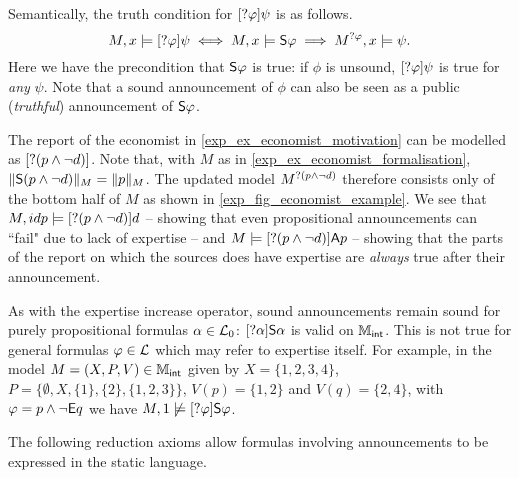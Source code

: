 Semantically, the truth condition for $[\sndann\phi]\psi$ is as follows.
\[
M, x \models [\sndann\phi]\psi
    \iff
M, x \models \S\phi \implies M^{\sndann\phi}, x \models \psi.
\]
Here we have the precondition that $\S\phi$ is true: if $\phi$ is unsound,
$[\sndann\phi]\psi$ is true for \emph{any} $\psi$. Note that a sound
announcement of $\phi$ can also be seen as a public (\emph{truthful})
announcement of $\S\phi$.

\begin{example}
\label{exp_ex_dynamic}

    The report of the economist in \cref{exp_ex_economist_motivation} can be
    modelled as $[\sndann(p \land \neg d)]$. Note that, with $M$ as in
    \cref{exp_ex_economist_formalisation}, $\|\S(p \land \neg d)\|_M = \|p\|_M$.
    The updated model $M^{\sndann(p \land \neg d)}$ therefore consists only of
    the bottom half of $M$ as shown in \cref{exp_fig_economist_example}. We see
    that $M, idp \models [\sndann(p \land \neg d)]d$ -- showing that even
    propositional announcements can ``fail" due to lack of expertise -- and $M
    \models [\sndann(p \land \neg d)]\A p$ -- showing that the parts of the
    report on which the sources does have expertise are \emph{always} true
    after their announcement.

\end{example}

As with the expertise increase operator, sound announcements remain sound for
purely propositional formulas $\alpha \in \cLzero$:
$[\sndann\alpha]\S\alpha$ is valid on $\Mint$. This is
not true for general formulas $\phi \in \cL$ which may refer to expertise
itself. For example, in the model $M = (X, P, V) \in \Mint$ given by
$X = \{1,2,3,4\}$, $P = \{\emptyset, X, \{1\}, \{2\}, \{1, 2,
3\}\}$, $V(p) = \{1, 2\}$ and $V(q) = \{2, 4\}$, with $\phi =
p \land \neg\E q$ we have $M, 1 \not\models [\sndann\phi]\S\phi$.

The following reduction axioms allow formulas involving announcements to be
expressed in the static language.

